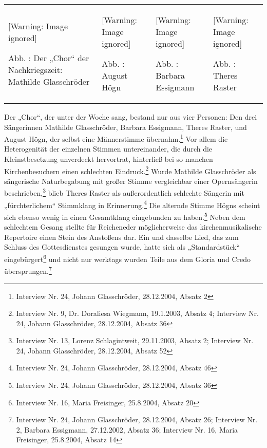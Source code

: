 \documentclass[a4paper]{article}
\newcounter{Abb}
\renewcommand\theAbb{\arabic{Abb}}
\begin{document}
\begin{flushleft}
\tablefirsthead{}
\tablehead{}
\tabletail{}
\tablelasttail{}
\begin{supertabular}{m{3.5939999cm}m{4.361cm}m{4.123cm}m{3.3769999cm}}
  [Warning: Image ignored] %
 
Abb. \stepcounter{Abb}{\theAbb}: Der „Chor“ der Nachkriegszeit: Mathilde
Glasschröder &
  [Warning: Image ignored] %
 
Abb. \stepcounter{Abb}{\theAbb}: August Högn &
  [Warning: Image ignored] %
 
Abb. \stepcounter{Abb}{\theAbb}: Barbara Essigmann  &
  [Warning: Image ignored] %
 
Abb. \stepcounter{Abb}{\theAbb}: Theres Raster\\
\end{supertabular}
\end{flushleft}
Der „Chor“, der unter der Woche sang, bestand nur aus vier Personen: Den
drei Sängerinnen Mathilde Glasschröder, Barbara Essigmann, Theres
Raster, und August Högn, der selbst eine Männerstimme
übernahm.\footnote{ Interview Nr. 24, Johann Glasschröder, 28.12.2004,
Absatz 2} Vor allem die Heterogenität der einzelnen Stimmen
untereinander, die durch die Kleinstbesetzung unverdeckt hervortrat,
hinterließ bei so manchen Kirchenbesuchern einen schlechten
Eindruck.\footnote{ Interview Nr. 9, Dr. Doraliesa Wiegmann, 19.1.2003,
Absatz 4; Interview Nr. 24, Johann Glasschröder, 28.12.2004, Absatz 36}
Wurde Mathilde Glasschröder als sängerische Naturbegabung mit großer
Stimme vergleichbar einer Opernsängerin beschrieben,\footnote{
Interview Nr. 13, Lorenz Schlagintweit, 29.11.2003, Absatz 2; Interview
Nr. 24, Johann Glasschröder, 28.12.2004, Absatz 52} blieb Theres Raster
als außerordentlich schlechte Sängerin mit „fürchterlichem“ Stimmklang
in Erinnerung.\footnote{ Interview Nr. 24, Johann Glasschröder,
28.12.2004, Absatz 46} Die alternde Stimme Högns scheint sich ebenso
wenig in einen Gesamtklang eingebunden zu haben.\footnote{ Interview
Nr. 24, Johann Glasschröder, 28.12.2004, Absatz 36} Neben dem
schlechtem Gesang stellte für Reicheneder möglicherweise das
kirchenmusikalische Repertoire einen Stein des Anstoßens dar. Ein und
dasselbe Lied, das zum Schluss des Gottesdienstes gesungen wurde, hatte
sich als „Standardstück“ eingebürgert\footnote{ Interview Nr. 16, Maria
Freisinger, 25.8.2004, Absatz 20} und nicht nur werktags wurden Teile
aus dem Gloria und Credo übersprungen.\footnote{ Interview Nr. 24,
Johann Glasschröder, 28.12.2004, Absatz 26; Interview Nr. 2, Barbara
Essigmann, 27.12.2002, Absatz 36; Interview Nr. 16, Maria Freisinger,
25.8.2004, Absatz 14}
\end{document}
